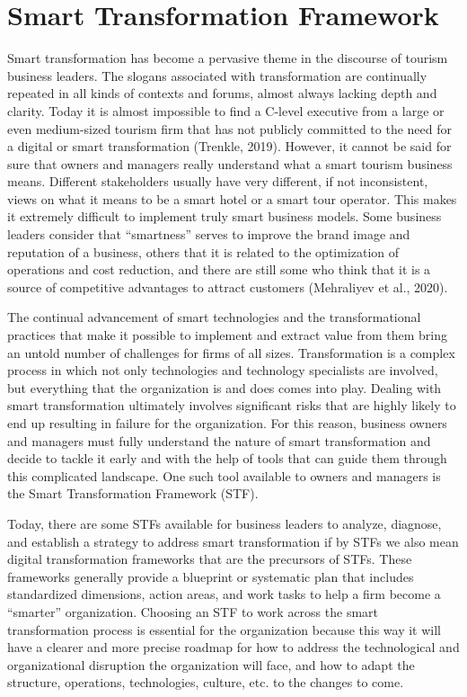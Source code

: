 \documentclass[
  letterpaper,
  DIV=11,
  numbers=noendperiod]{scrreprt}
\begin{document}
\hypertarget{smart-transformation-framework}{%
\chapter{Smart Transformation
Framework}\label{smart-transformation-framework}}

Smart transformation has become a pervasive theme in the discourse of
tourism business leaders. The slogans associated with transformation are
continually repeated in all kinds of contexts and forums, almost always
lacking depth and clarity. Today it is almost impossible to find a
C-level executive from a large or even medium-sized tourism firm that
has not publicly committed to the need for a digital or smart
transformation (Trenkle, 2019). However, it cannot be said for sure that
owners and managers really understand what a smart tourism business
means. Different stakeholders usually have very different, if not
inconsistent, views on what it means to be a smart hotel or a smart tour
operator. This makes it extremely difficult to implement truly smart
business models. Some business leaders consider that ``smartness''
serves to improve the brand image and reputation of a business, others
that it is related to the optimization of operations and cost reduction,
and there are still some who think that it is a source of competitive
advantages to attract customers (Mehraliyev et al., 2020).

The continual advancement of smart technologies and the transformational
practices that make it possible to implement and extract value from them
bring an untold number of challenges for firms of all sizes.
Transformation is a complex process in which not only technologies and
technology specialists are involved, but everything that the
organization is and does comes into play. Dealing with smart
transformation ultimately involves significant risks that are highly
likely to end up resulting in failure for the organization. For this
reason, business owners and managers must fully understand the nature of
smart transformation and decide to tackle it early and with the help of
tools that can guide them through this complicated landscape. One such
tool available to owners and managers is the Smart Transformation
Framework (STF).

Today, there are some STFs available for business leaders to analyze,
diagnose, and establish a strategy to address smart transformation if by
STFs we also mean digital transformation frameworks that are the
precursors of STFs. These frameworks generally provide a blueprint or
systematic plan that includes standardized dimensions, action areas, and
work tasks to help a firm become a ``smarter'' organization. Choosing an
STF to work across the smart transformation process is essential for the
organization because this way it will have a clearer and more precise
roadmap for how to address the technological and organizational
disruption the organization will face, and how to adapt the structure,
operations, technologies, culture, etc. to the changes to come.
\end{document}
